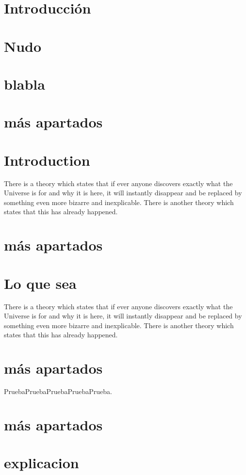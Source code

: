 \documentclass[12pt]{article}
\begin{document}

\tableofcontents
\pagebreak


\section{Introducción}
\section{Nudo}
\section{blabla}
\section{más apartados}
\section{Introduction}
There is a theory which states that if ever anyone discovers exactly what the Universe is for and why it is here, it will instantly disappear and be replaced by something even more bizarre and inexplicable.
There is another theory which states that this has already happened.
\section{más apartados}
\section{Lo que sea}
There is a theory which states that if ever anyone discovers exactly what the Universe is for and why it is here, it will instantly disappear and be replaced by something even more bizarre and inexplicable.
There is another theory which states that this has already happened.
\section{más apartados}
PruebaPruebaPruebaPruebaPrueba.
\section{más apartados}
\section{explicacion}
\end{document}
